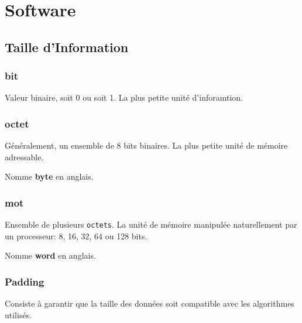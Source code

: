\documentclass{article}
\begin{document}
\section{Software}


\subsection{Taille d'Information}
\subsubsection{bit}
\begin{definition}
    Valeur binaire, soit 0 ou soit 1. La plus petite unité d'inforamtion.
\end{definition}

\subsubsection{octet}
\begin{definition}
    Généralement, un ensemble de 8 bits binaires. La plus petite unité de mémoire adressable.
    
    \begin{remark}
        Nomme \textbf{byte} en anglais.
    \end{remark}
\end{definition}

\subsubsection{mot}
\begin{definition}
    Ensemble de plusieurs \texttt{octets}. La unité de mémoire manipulée naturellement par un processeur: 8, 16, 32, 64 ou 128 bits.

    \begin{remark}
        Nomme \textbf{word} en anglais.
    \end{remark}
\end{definition}

\subsubsection{Padding}
\begin{definition}
    Consiste à garantir que la taille des données soit compatible avec les algorithmes utilisés.
\end{definition}
\end{document}
